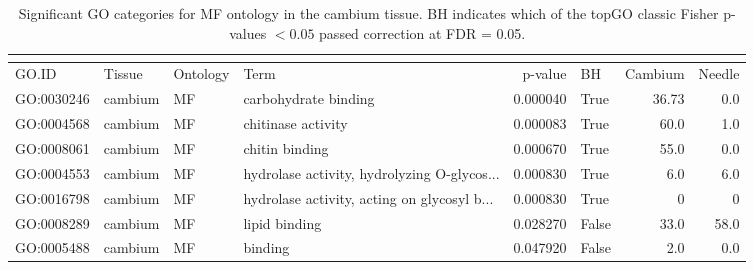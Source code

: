 \begin{longtable}{llllrlrr}
\caption{Significant GO categories for MF ontology in the cambium tissue. BH indicates which of the topGO classic Fisher p-values $< 0.05$ passed correction at FDR = 0.05.}\\
\label{tab:go-cambium-MF}\\
\toprule
GO.ID & Tissue & Ontology & Term & p-value & BH & Cambium & Needle \\
\midrule
GO:0030246 & cambium & MF &   carbohydrate binding  & 0.000040 &   True  & 36.73 & 0.0 \\ 
GO:0004568 & cambium & MF &   chitinase activity  & 0.000083 &   True  & 60.0 & 1.0 \\ 
GO:0008061 & cambium & MF &   chitin binding  & 0.000670 &   True  & 55.0 & 0.0 \\ 
GO:0004553 & cambium & MF &   hydrolase activity, hydrolyzing O-glycos...  & 0.000830 &   True  & 6.0 & 6.0 \\ 
GO:0016798 & cambium & MF &   hydrolase activity, acting on glycosyl b...  & 0.000830 &   True  & 0 & 0 \\
GO:0008289 & cambium & MF &   lipid binding  & 0.028270 &   False  & 33.0 & 58.0 \\ 
GO:0005488 & cambium & MF &   binding  & 0.047920 &   False  & 2.0 & 0.0 \\ 
\bottomrule
\end{longtable}
